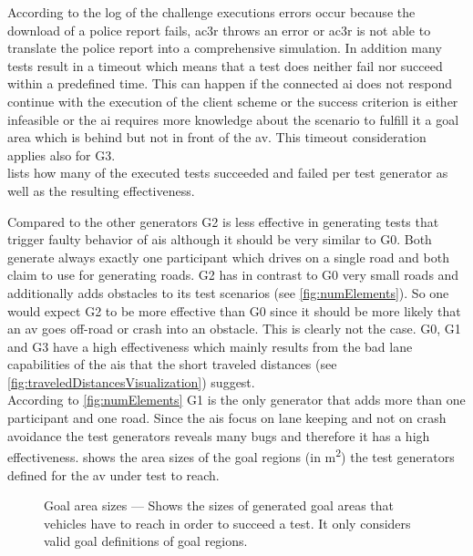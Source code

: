 According to the log of the challenge executions errors occur because the download of a police report fails, \gls{ac3r} throws an error or \gls{ac3r} is not able to translate the police report into a comprehensive simulation.
In addition many tests result in a timeout which means that a test does neither fail nor succeed within a predefined time.
This can happen if the connected \gls{ai} does not respond \ie{} continue with the execution of the client scheme or the success criterion is either infeasible or the \gls{ai} requires more knowledge about the scenario to fulfill it \eg{} a goal area which is behind but not in front of the \gls{av}.
This timeout consideration applies also for G3.\\
 lists how many of the executed tests succeeded and failed per test generator as well as the resulting effectiveness.
\begin{table}
    \centering
    \caption{%
        Test generator effectiveness --- Displays the calculation of the effectiveness of the test generators.
        Higher values indicate higher effectiveness.
    }\label{tab:effectivenessGenerators}
    \medskip
    
\end{table}
Compared to the other generators G2 is less effective in generating tests that trigger faulty behavior of \glspl{ai} although it should be very similar to G0.
Both generate always exactly one participant which drives on a single road and both claim to use \asfault{} for generating roads.
G2 has in contrast to G0 very small roads and additionally adds obstacles to its test scenarios (see \cref{fig:numElements}).
So one would expect G2 to be more effective than G0 since it should be more likely that an \gls{av} goes off-road or crash into an obstacle. 
This is clearly not the case.
G0, G1 and G3 have a high effectiveness which mainly results from the bad lane capabilities of the \glspl{ai} that the short traveled distances (see \cref{fig:traveledDistancesVisualization}) suggest.\\
According to \cref{fig:numElements} G1 is the only generator that adds more than one participant and one road.
Since the \glspl{ai} focus on lane keeping and not on crash avoidance the test generators reveals many bugs and therefore it has a high effectiveness.
 shows the area sizes of the goal regions (in \si{\metre^2}) the test generators defined for the \gls{av} under test to reach.
\begin{figure}
    
    \medskip
    \caption{%
        Goal area sizes --- Shows the sizes of generated goal areas that vehicles have to reach in order to succeed a test.
        It only considers valid goal definitions of goal regions.
    }\label{fig:goalRegionSizes}
\end{figure}
